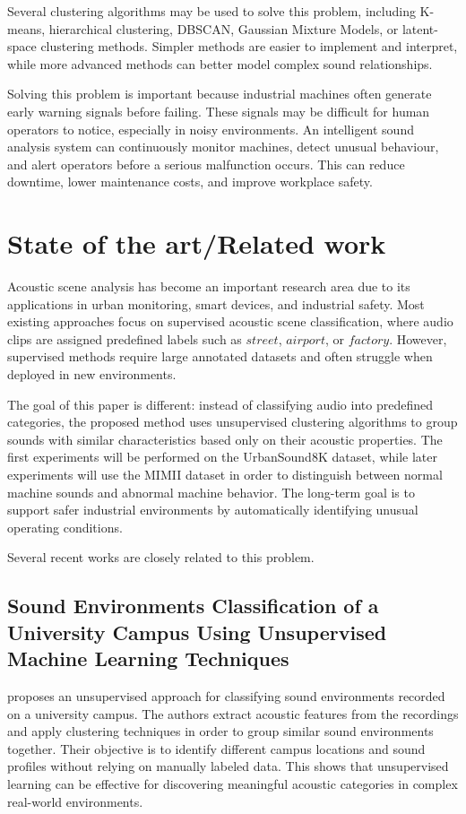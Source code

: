 \documentclass[runningheads,a4paper,11pt]{report}
\begin{document}
Several clustering algorithms may be used to solve this problem, including K-means, hierarchical clustering, DBSCAN, Gaussian Mixture Models, or latent-space clustering methods. Simpler methods are easier to implement and interpret, while more advanced methods can better model complex sound relationships.

Solving this problem is important because industrial machines often generate early warning signals before failing. These signals may be difficult for human operators to notice, especially in noisy environments. An intelligent sound analysis system can continuously monitor machines, detect unusual behaviour, and alert operators before a serious malfunction occurs. This can reduce downtime, lower maintenance costs, and improve workplace safety. 


\chapter{State of the art/Related work}
\label{chapter:stateOfArt}

Acoustic scene analysis has become an important research area due to its applications in urban monitoring, smart devices, and industrial safety. Most existing approaches focus on supervised acoustic scene classification, where audio clips are assigned predefined labels such as $street$, $airport$, or $factory$. However, supervised methods require large annotated datasets and often struggle when deployed in new environments. 

The goal of this paper is different: instead of classifying audio into predefined categories, the proposed method uses unsupervised clustering algorithms to group sounds with similar characteristics based only on their acoustic properties. The first experiments will be performed on the UrbanSound8K dataset, while later experiments will use the MIMII dataset in order to distinguish between normal machine sounds and abnormal machine behavior. The long-term goal is to support safer industrial environments by automatically identifying unusual operating conditions.

Several recent works are closely related to this problem.

\section{Sound Environments Classification of a University Campus Using Unsupervised Machine Learning Techniques}

\cite{soundenvironmentsclassification} proposes an unsupervised approach for classifying sound environments recorded on a university campus. The authors extract acoustic features from the recordings and apply clustering techniques in order to group similar sound environments together. Their objective is to identify different campus locations and sound profiles without relying on manually labeled data. This shows that unsupervised learning can be effective for discovering meaningful acoustic categories in complex real-world environments.
\end{document}

